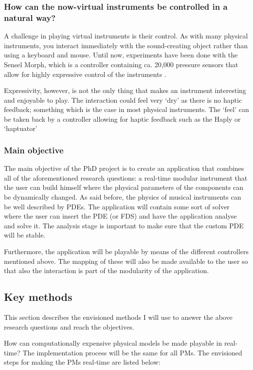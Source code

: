 \subsubsection*{How can the now-virtual instruments be controlled in a natural way?}
A challenge in playing virtual instruments is their control. As with many physical instruments, you interact immediately with the sound-creating object rather than using a keyboard and mouse. Until now, experiments have been done with the Sensel Morph, which is a controller containing ca. 20,000 pressure sensors that allow for highly expressive control of the instruments \cite{Sensel2019}.

Expressivity, however, is not the only thing that makes an instrument interesting and enjoyable to play. The interaction could feel very `dry' as there is no haptic feedback; something which is the case in most physical instruments.  The `feel' can be taken back by a controller allowing for haptic feedback such as the Haply \cite{Haply2019} or `haptuator' \cite{tactile2019}

\subsubsection*{Main objective}
The main objective of the PhD project is to create an application that combines all of the aforementioned research questions: a real-time modular instrument that the user can build himself where the physical parameters of the components can be dynamically changed. As said before, the physics of musical instruments can be well described by PDEs. The application will contain some sort of solver where the user can insert the PDE (or FDS) and have the application analyse and solve it. The analysis stage is important to make sure that the custom PDE will be stable. 

Furthermore, the application will be playable by means of the different controllers mentioned above. The mapping of these will also be made available to the user so that also the interaction is part of the modularity of the application.

\subsection{Key methods}
This section describes the envisioned methods I will use to answer the above research questions and reach the objectives.

How can computationally expensive physical models be made playable in real-time?
The implementation process will be the same for all PMs. The envisioned steps for making the PMs real-time are listed below:

